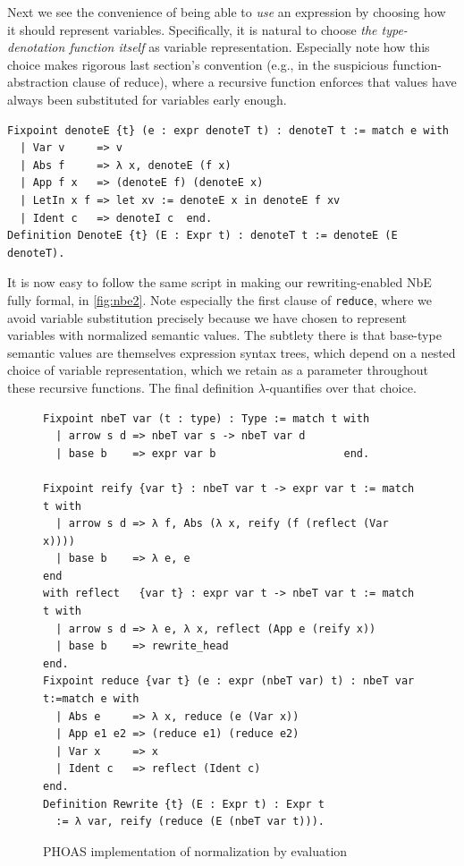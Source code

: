 \documentclass[sn-mathphys,pdflatex]{sn-jnl}%
\theoremstyle{thmstyleone}%
\theoremstyle{thmstyletwo}%
\theoremstyle{thmstylethree}%
\begin{document}
Next we see the convenience of being able to \emph{use} an expression by choosing how it should represent variables.
Specifically, it is natural to choose \emph{the type-denotation function itself} as variable representation.
Especially note how this choice makes rigorous last section's convention (e.g., in the suspicious function-abstraction clause of reduce), where a recursive function enforces that values have always been substituted for variables early enough.
\begin{verbatim}
Fixpoint denoteE {t} (e : expr denoteT t) : denoteT t := match e with
  | Var v     => v
  | Abs f     => λ x, denoteE (f x)
  | App f x   => (denoteE f) (denoteE x)
  | LetIn x f => let xv := denoteE x in denoteE f xv
  | Ident c   => denoteI c  end.
Definition DenoteE {t} (E : Expr t) : denoteT t := denoteE (E denoteT).
\end{verbatim}

It is now easy to follow the same script in making our rewriting-enabled NbE fully formal, in \autoref{fig:nbe2}.
Note especially the first clause of \texttt{reduce}, where we avoid variable substitution precisely because we have chosen to represent variables with normalized semantic values.
The subtlety there is that base-type semantic values are themselves expression syntax trees, which depend on a nested choice of variable representation, which we retain as a parameter throughout these recursive functions.
The final definition $\lambda$-quantifies over that choice.

\begin{figure}[b]
\begin{verbatim}
Fixpoint nbeT var (t : type) : Type := match t with
  | arrow s d => nbeT var s -> nbeT var d
  | base b    => expr var b                    end.

Fixpoint reify {var t} : nbeT var t -> expr var t := match t with
  | arrow s d => λ f, Abs (λ x, reify (f (reflect (Var x))))
  | base b    => λ e, e                                      end
with reflect   {var t} : expr var t -> nbeT var t := match t with
  | arrow s d => λ e, λ x, reflect (App e (reify x))
  | base b    => rewrite_head                                end.
Fixpoint reduce {var t} (e : expr (nbeT var) t) : nbeT var t:=match e with
  | Abs e     => λ x, reduce (e (Var x))
  | App e1 e2 => (reduce e1) (reduce e2)
  | Var x     => x
  | Ident c   => reflect (Ident c)                            end.
Definition Rewrite {t} (E : Expr t) : Expr t
  := λ var, reify (reduce (E (nbeT var t))).
\end{verbatim}
  \caption{\label{fig:nbe2}PHOAS implementation of normalization by evaluation}
\end{figure}
\end{document}
